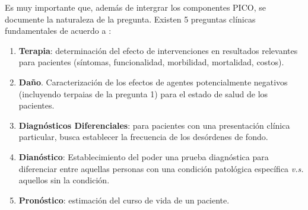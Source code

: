\documentclass[]{book}
\providecommand{\tightlist}{%
  \setlength{\itemsep}{0pt}\setlength{\parskip}{0pt}}
\begin{document}
Es muy importante que, además de intergrar los componentes PICO, se documente la naturaleza de la pregunta. Existen 5 preguntas clínicas fundamentales de acuerdo a \citep{guyatt2002users}:

\begin{enumerate}
\def\labelenumi{\arabic{enumi}.}
\tightlist
\item
  \textbf{Terapia}: determinación del efecto de intervenciones en resultados relevantes para pacientes (síntomas, funcionalidad, morbilidad, mortalidad, costos).
\item
  \textbf{Daño}. Caracterización de los efectos de agentes potencialmente negativos (incluyendo terpaias de la pregunta 1) para el estado de salud de los pacientes.
\item
  \textbf{Diagnósticos Diferenciales}: para pacientes con una presentación clínica particular, busca establecer la frecuencia de los desórdenes de fondo.
\item
  \textbf{Dianóstico}: Establecimiento del poder una prueba diagnóstica para diferenciar entre aquellas personas con una condición patológica específica \emph{v.s.} aquellos sin la condición.
\item
  \textbf{Pronóstico}: estimación del curso de vida de un paciente.
\end{enumerate}


\end{document}
